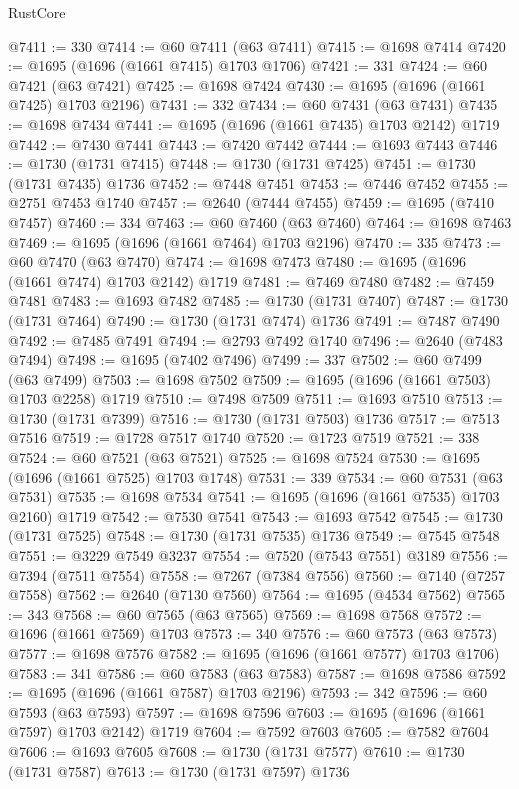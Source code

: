 \begin{lexlean}{RustCore}
\begin{coremodule}
@7411 := 330
@7414 := @60 @7411 (@63 @7411)
@7415 := @1698 @7414
@7420 := @1695 (@1696 (@1661 @7415) @1703 @1706)
@7421 := 331
@7424 := @60 @7421 (@63 @7421)
@7425 := @1698 @7424
@7430 := @1695 (@1696 (@1661 @7425) @1703 @2196)
@7431 := 332
@7434 := @60 @7431 (@63 @7431)
@7435 := @1698 @7434
@7441 := @1695 (@1696 (@1661 @7435) @1703 @2142) @1719
@7442 := @7430 @7441
@7443 := @7420 @7442
@7444 := @1693 @7443
@7446 := @1730 (@1731 @7415)
@7448 := @1730 (@1731 @7425)
@7451 := @1730 (@1731 @7435) @1736
@7452 := @7448 @7451
@7453 := @7446 @7452
@7455 := @2751 @7453 @1740
@7457 := @2640 (@7444 @7455)
@7459 := @1695 (@7410 @7457)
@7460 := 334
@7463 := @60 @7460 (@63 @7460)
@7464 := @1698 @7463
@7469 := @1695 (@1696 (@1661 @7464) @1703 @2196)
@7470 := 335
@7473 := @60 @7470 (@63 @7470)
@7474 := @1698 @7473
@7480 := @1695 (@1696 (@1661 @7474) @1703 @2142) @1719
@7481 := @7469 @7480
@7482 := @7459 @7481
@7483 := @1693 @7482
@7485 := @1730 (@1731 @7407)
@7487 := @1730 (@1731 @7464)
@7490 := @1730 (@1731 @7474) @1736
@7491 := @7487 @7490
@7492 := @7485 @7491
@7494 := @2793 @7492 @1740
@7496 := @2640 (@7483 @7494)
@7498 := @1695 (@7402 @7496)
@7499 := 337
@7502 := @60 @7499 (@63 @7499)
@7503 := @1698 @7502
@7509 := @1695 (@1696 (@1661 @7503) @1703 @2258) @1719
@7510 := @7498 @7509
@7511 := @1693 @7510
@7513 := @1730 (@1731 @7399)
@7516 := @1730 (@1731 @7503) @1736
@7517 := @7513 @7516
@7519 := @1728 @7517 @1740
@7520 := @1723 @7519
@7521 := 338
@7524 := @60 @7521 (@63 @7521)
@7525 := @1698 @7524
@7530 := @1695 (@1696 (@1661 @7525) @1703 @1748)
@7531 := 339
@7534 := @60 @7531 (@63 @7531)
@7535 := @1698 @7534
@7541 := @1695 (@1696 (@1661 @7535) @1703 @2160) @1719
@7542 := @7530 @7541
@7543 := @1693 @7542
@7545 := @1730 (@1731 @7525)
@7548 := @1730 (@1731 @7535) @1736
@7549 := @7545 @7548
@7551 := @3229 @7549 @3237
@7554 := @7520 (@7543 @7551) @3189
@7556 := @7394 (@7511 @7554)
@7558 := @7267 (@7384 @7556)
@7560 := @7140 (@7257 @7558)
@7562 := @2640 (@7130 @7560)
@7564 := @1695 (@4534 @7562)
@7565 := 343
@7568 := @60 @7565 (@63 @7565)
@7569 := @1698 @7568
@7572 := @1696 (@1661 @7569) @1703
@7573 := 340
@7576 := @60 @7573 (@63 @7573)
@7577 := @1698 @7576
@7582 := @1695 (@1696 (@1661 @7577) @1703 @1706)
@7583 := 341
@7586 := @60 @7583 (@63 @7583)
@7587 := @1698 @7586
@7592 := @1695 (@1696 (@1661 @7587) @1703 @2196)
@7593 := 342
@7596 := @60 @7593 (@63 @7593)
@7597 := @1698 @7596
@7603 := @1695 (@1696 (@1661 @7597) @1703 @2142) @1719
@7604 := @7592 @7603
@7605 := @7582 @7604
@7606 := @1693 @7605
@7608 := @1730 (@1731 @7577)
@7610 := @1730 (@1731 @7587)
@7613 := @1730 (@1731 @7597) @1736

\end{coremodule}
\end{lexlean}
